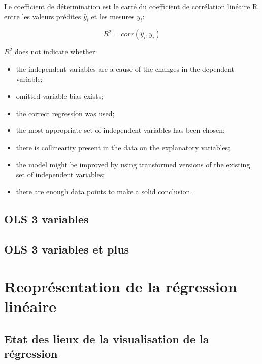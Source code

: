 \documentclass[
]{report}
\providecommand{\tightlist}{%
  \setlength{\itemsep}{0pt}\setlength{\parskip}{0pt}}
\begin{document}
Le coefficient de détermination est le carré du coefficient de corrélation linéaire R entre les valeurs prédites \(\hat{y}_{i}\) et les mesures \(y_i\):

\[R^2=corr(\hat{y}_{i},y_i)\]

\(R^2\) does not indicate whether:

\begin{itemize}
\tightlist
\item
  the independent variables are a cause of the changes in the dependent variable;
\item
  omitted-variable bias exists;
\item
  the correct regression was used;
\item
  the most appropriate set of independent variables has been chosen;
\item
  there is collinearity present in the data on the explanatory variables;
\item
  the model might be improved by using transformed versions of the existing set of independent variables;
\item
  there are enough data points to make a solid conclusion.
\end{itemize}

\hypertarget{ols-3-variables}{%
\section{OLS 3 variables}\label{ols-3-variables}}

\hypertarget{ols-3-variables-et-plus}{%
\section{OLS 3 variables et plus}\label{ols-3-variables-et-plus}}

\hypertarget{reopruxe9sentation-de-la-ruxe9gression-linuxe9aire}{%
\chapter{Reoprésentation de la régression linéaire}\label{reopruxe9sentation-de-la-ruxe9gression-linuxe9aire}}

\hypertarget{etat-des-lieux-de-la-visualisation-de-la-ruxe9gression}{%
\section{Etat des lieux de la visualisation de la régression}\label{etat-des-lieux-de-la-visualisation-de-la-ruxe9gression}}
\end{document}
